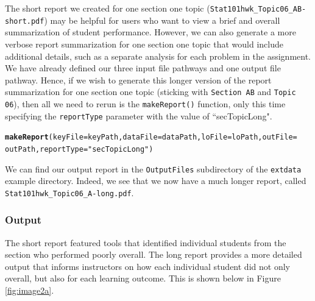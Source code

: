\documentclass{article}\usepackage[]{graphicx}\usepackage[]{color}
\makeatletter
\newcommand{\hlstr}[1]{\textcolor[rgb]{0.192,0.494,0.8}{#1}}%
\newcommand{\hlstd}[1]{\textcolor[rgb]{0.345,0.345,0.345}{#1}}%
\newcommand{\hlkwc}[1]{\textcolor[rgb]{0.333,0.667,0.333}{#1}}%
\newcommand{\hlkwd}[1]{\textcolor[rgb]{0.737,0.353,0.396}{\textbf{#1}}}%
\newenvironment{kframe}{%
 \def\at@end@of@kframe{}%
 \ifinner\ifhmode%
  \def\at@end@of@kframe{\end{minipage}}%
  \begin{minipage}{\columnwidth}%
 \fi\fi%
 \def\FrameCommand##1{\hskip\@totalleftmargin \hskip-\fboxsep
 \colorbox{shadecolor}{##1}\hskip-\fboxsep
     \hskip-\linewidth \hskip-\@totalleftmargin \hskip\columnwidth}%
 \MakeFramed {\advance\hsize-\width
   \@totalleftmargin\z@ \linewidth\hsize
   \@setminipage}}%
 {\par\unskip\endMakeFramed%
 \at@end@of@kframe}
\newenvironment{knitrout}{}{} %
\numberwithin{equation}{section} %
\makeatother
\begin{document}
The short report we created for one section one topic (\texttt{Stat101hwk\_Topic06\_AB-short.pdf}) may be helpful for users who want to view a brief and overall summarization of student performance. However, we can also generate a more verbose report summarization for one section one topic that would include additional details, such as a separate analysis for each problem in the assignment. We have already defined our three input file pathways and one output file pathway. Hence, if we wish to generate this longer version of the report summarization for one section one topic (sticking with \texttt{Section AB} and \texttt{Topic 06}), then all we need to rerun is the \texttt{makeReport()} function, only this time specifying the \texttt{reportType} parameter with the value of ``secTopicLong".

\begin{knitrout}
\color{fgcolor}\begin{kframe}
\begin{alltt}
\hlkwd{makeReport}\hlstd{(}\hlkwc{keyFile} \hlstd{= keyPath,} \hlkwc{dataFile} \hlstd{= dataPath,} \hlkwc{loFile} \hlstd{= loPath,} \hlkwc{outFile} \hlstd{=}
  \hlstd{outPath,} \hlkwc{reportType} \hlstd{=} \hlstr{"secTopicLong"}\hlstd{)}
\end{alltt}
\end{kframe}
\end{knitrout}

We can find our output report in the \texttt{OutputFiles} subdirectory of the \texttt{extdata} example directory. Indeed, we see that we now have a much longer report, called \texttt{Stat101hwk\_Topic06\_A-long.pdf}.

\subsubsection{Output}

The short report featured tools that identified individual students from the section who performed poorly overall. The long report provides a more detailed output that informs instructors on how each individual student did not only overall, but also for each learning outcome. This is shown below in Figure \ref{fig:image2a}.
\end{document}
